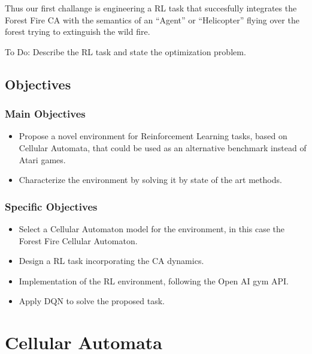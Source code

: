 \documentclass[
  openany]{book}
\providecommand{\tightlist}{%
  \setlength{\itemsep}{0pt}\setlength{\parskip}{0pt}}
\begin{document}
Thus our first challange is engineering a RL task that succesfully integrates the Forest Fire CA with the semantics of an ``Agent'' or ``Helicopter'' flying over the forest trying to extinguish the wild fire.

To Do: Describe the RL task and state the optimization problem.

\hypertarget{objectives}{%
\section{Objectives}\label{objectives}}

\hypertarget{main-objectives}{%
\subsection{Main Objectives}\label{main-objectives}}

\begin{itemize}
\tightlist
\item
  Propose a novel environment for Reinforcement Learning tasks, based on Cellular Automata, that could be used as an alternative benchmark instead of Atari games.
\item
  Characterize the environment by solving it by state of the art methods.
\end{itemize}

\hypertarget{specific-objectives}{%
\subsection{Specific Objectives}\label{specific-objectives}}

\begin{itemize}
\tightlist
\item
  Select a Cellular Automaton model for the environment, in this case the Forest Fire Cellular Automaton.
\item
  Design a RL task incorporating the CA dynamics.
\item
  Implementation of the RL environment, following the Open AI gym API.
\item
  Apply DQN to solve the proposed task.
\end{itemize}

\hypertarget{cellular-automata}{%
\chapter{Cellular Automata}\label{cellular-automata}}
\end{document}
